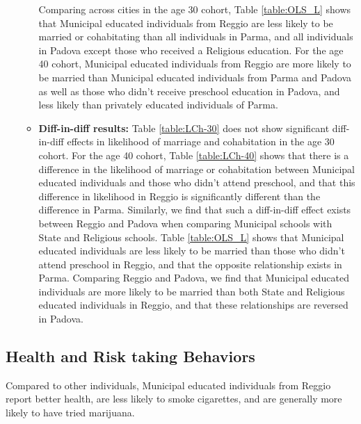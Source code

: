 \documentclass[11pt]{article}
\begin{document}
\begin{itemize}
\begin{itemize}
	Comparing across cities in the age 30 cohort, Table \ref{table:OLS_L} shows that Municipal educated individuals from Reggio are less likely to be married or cohabitating than all individuals in Parma, and all individuals in Padova except those who received a Religious education. For the age 40 cohort, Municipal educated individuals from Reggio are more likely to be married than Municipal educated individuals from Parma and Padova as well as those who didn't receive preschool education in Padova, and less likely than privately educated individuals of Parma.

	\item \textbf{Diff-in-diff results:} Table \ref{table:LCh-30} does not show significant diff-in-diff effects in likelihood of marriage and cohabitation in the age 30 cohort. For the age 40 cohort, Table \ref{table:LCh-40} shows that there is a difference in the likelihood of marriage or cohabitation between Municipal educated individuals and those who didn't attend preschool, and that this difference in likelihood in Reggio is significantly different than the difference in Parma. Similarly, we find that such a diff-in-diff effect exists between Reggio and Padova when comparing Municipal schools with State and Religious schools. Table \ref{table:OLS_L} shows that Municipal educated individuals are less likely to be married than those who didn't attend preschool in Reggio, and that the opposite relationship exists in Parma. Comparing Reggio and Padova, we find that Municipal educated individuals are more likely to be married than both State and Religious educated individuals in Reggio, and that these relationships are reversed in Padova.
	\end{itemize}	
\end{itemize}  

\subsection{Health and Risk taking Behaviors}
Compared to other individuals, Municipal educated individuals from Reggio report better health, are less likely to smoke cigarettes, and are generally more likely to have tried marijuana.
\end{document}
